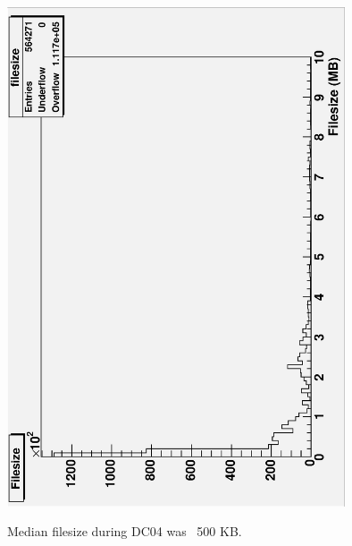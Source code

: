 \documentclass{cmspaper}
\begin{document}
\begin{figure}[tbp]
\centering
\includegraphics[width=10cm, angle=-90]{filesizes.eps}
\label{fig:filesizes}
\caption{Median filesize during DC04 was ~500 KB.}
\end{figure}
\end{document}
